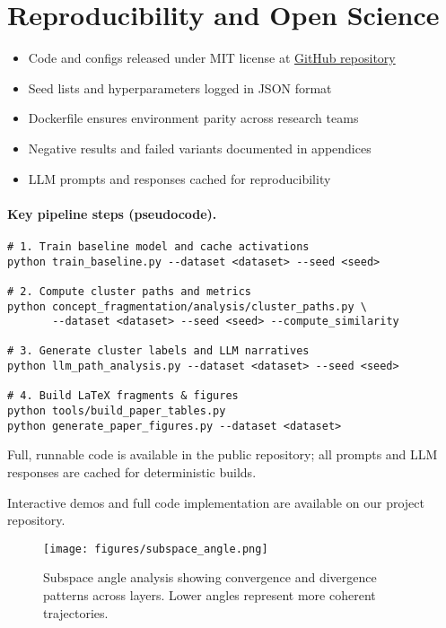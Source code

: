 \section{Reproducibility and Open Science}

\begin{itemize}
    \item Code and configs released under MIT license at \href{https://github.com/ConceptualFragmentationInLLMsAnalysisAndVisualization}{GitHub repository}
    \item Seed lists and hyperparameters logged in JSON format
    \item Dockerfile ensures environment parity across research teams
    \item Negative results and failed variants documented in appendices
    \item LLM prompts and responses cached for reproducibility
\end{itemize}

\paragraph{Key pipeline steps (pseudocode).}

\begin{verbatim}
# 1. Train baseline model and cache activations
python train_baseline.py --dataset <dataset> --seed <seed>

# 2. Compute cluster paths and metrics
python concept_fragmentation/analysis/cluster_paths.py \
       --dataset <dataset> --seed <seed> --compute_similarity

# 3. Generate cluster labels and LLM narratives
python llm_path_analysis.py --dataset <dataset> --seed <seed>

# 4. Build LaTeX fragments & figures
python tools/build_paper_tables.py
python generate_paper_figures.py --dataset <dataset>
\end{verbatim}

Full, runnable code is available in the public repository; all prompts and
LLM responses are cached for deterministic builds.

Interactive demos and full code implementation are available on our project repository.

\begin{figure}[ht]
    \centering
    \texttt{[image: figures/subspace\_angle.png]}
    \caption{Subspace angle analysis showing convergence and divergence patterns across layers. Lower angles represent more coherent trajectories.}
    \label{fig:subspace_angle}
\end{figure}